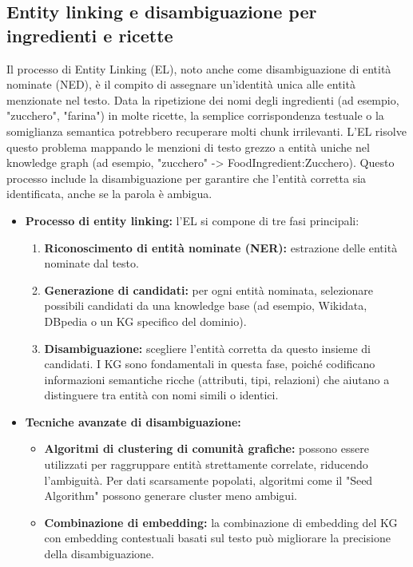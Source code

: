 \documentclass[a4paper, 11pt]{article}
\begin{document}
\subsection{Entity linking e disambiguazione per ingredienti e ricette}
Il processo di Entity Linking (EL), noto anche come disambiguazione di entità nominate (NED), è il compito di assegnare un'identità unica alle entità menzionate nel testo. \cite{entity_linking_wiki} Data la ripetizione dei nomi degli ingredienti (ad esempio, "zucchero", "farina") in molte ricette, la semplice corrispondenza testuale o la somiglianza semantica potrebbero recuperare molti chunk irrilevanti. L'EL risolve questo problema mappando le menzioni di testo grezzo a entità uniche nel knowledge graph (ad esempio, "zucchero" -> FoodIngredient:Zucchero). Questo processo include la disambiguazione \cite{entity_linking_wiki} per garantire che l'entità corretta sia identificata, anche se la parola è ambigua.
\begin{itemize}
    \item \textbf{Processo di entity linking:} l'EL si compone di tre fasi principali:
    \begin{enumerate}
        \item \textbf{Riconoscimento di entità nominate (NER):} estrazione delle entità nominate dal testo. \cite{entity_linking_wiki}
        \item \textbf{Generazione di candidati:} per ogni entità nominata, selezionare possibili candidati da una knowledge base (ad esempio, Wikidata, DBpedia o un KG specifico del dominio). \cite{entity_linking_wiki}
        \item \textbf{Disambiguazione:} scegliere l'entità corretta da questo insieme di candidati. \cite{entity_linking_wiki} I KG sono fondamentali in questa fase, poiché codificano informazioni semantiche ricche (attributi, tipi, relazioni) che aiutano a distinguere tra entità con nomi simili o identici. \cite{understanding_kg}
    \end{enumerate}
    \item \textbf{Tecniche avanzate di disambiguazione:}
    \begin{itemize}
        \item \textbf{Algoritmi di clustering di comunità grafiche:} possono essere utilizzati per raggruppare entità strettamente correlate, riducendo l'ambiguità. \cite{kg_entity_disambiguation} Per dati scarsamente popolati, algoritmi come il "Seed Algorithm" possono generare cluster meno ambigui. \cite{kg_entity_disambiguation}
        \item \textbf{Combinazione di embedding:} la combinazione di embedding del KG con embedding contestuali basati sul testo può migliorare la precisione della disambiguazione. \cite{ned_with_kg_harvard}
    \end{itemize}
\end{itemize}
\end{document}
